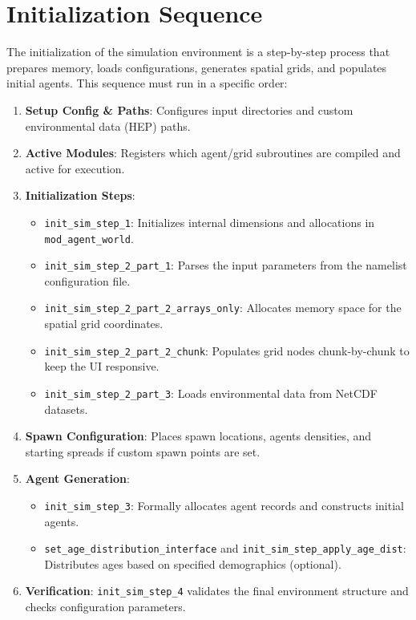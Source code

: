 \documentclass[14pt,a4paper]{extreport}
\begin{document}
\section{Initialization Sequence}
The initialization of the simulation environment is a step-by-step process that prepares memory, loads configurations, generates spatial grids, and populates initial agents. This sequence must run in a specific order:
\begin{enumerate}
    \item \textbf{Setup Config \& Paths}: Configures input directories and custom environmental data (HEP) paths.
    \item \textbf{Active Modules}: Registers which agent/grid subroutines are compiled and active for execution.
    \item \textbf{Initialization Steps}:
    \begin{itemize}
        \item \texttt{init\_sim\_step\_1}: Initializes internal dimensions and allocations in \texttt{mod\_agent\_world}.
        \item \texttt{init\_sim\_step\_2\_part\_1}: Parses the input parameters from the namelist configuration file.
        \item \texttt{init\_sim\_step\_2\_part\_2\_arrays\_only}: Allocates memory space for the spatial grid coordinates.
        \item \texttt{init\_sim\_step\_2\_part\_2\_chunk}: Populates grid nodes chunk-by-chunk to keep the UI responsive.
        \item \texttt{init\_sim\_step\_2\_part\_3}: Loads environmental data from NetCDF datasets.
    \end{itemize}
    \item \textbf{Spawn Configuration}: Places spawn locations, agents densities, and starting spreads if custom spawn points are set.
    \item \textbf{Agent Generation}:
    \begin{itemize}
        \item \texttt{init\_sim\_step\_3}: Formally allocates agent records and constructs initial agents.
        \item \texttt{set\_age\_distribution\_interface} and \texttt{init\_sim\_step\_apply\_age\_dist}: Distributes ages based on specified demographics (optional).
    \end{itemize}
    \item \textbf{Verification}: \texttt{init\_sim\_step\_4} validates the final environment structure and checks configuration parameters.
\end{enumerate}
\end{document}
